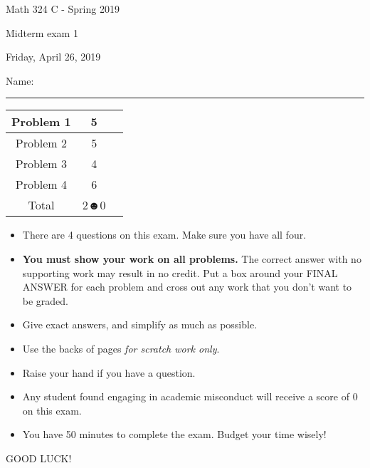 \documentclass[12 pt]{report}
\begin{document}
\noindent \vfill \noindent \large

\centerline{Math 324 C - Spring 2019}

\centerline{Midterm exam 1}

\centerline{Friday, April 26, 2019}

\normalsize

\vfill
\medskip
Name: \rule{10cm}{1pt}

\bigskip

\vfill
\begin{center}
{\large
\begin{tabular}{||c|c|r||}
\hline Problem 1 & 5 & \hspace{10mm} \hfill \\
\hline Problem 2 & 5  & \hspace{10mm} \hfill \\
\hline Problem 3 & 4 & \hspace{10mm} \hfill \\
\hline Problem 4 & 6  & \hspace{10mm} \hfill \\
\hline Total & 2☻0 & \hspace{10mm} \hfill \\
\hline
\end{tabular}
}
\end{center}
\vfill
\begin{itemize}
\item There are 4 questions on this exam. Make sure you have all four.
\item \textbf{You must show your work on all problems.}  The correct answer
with no supporting work may result in no credit. Put a box
around your FINAL ANSWER for each problem and cross out any work
that you don't want to be graded.
\item Give exact answers, and simplify as much as possible. 
\item Use the backs of pages \textit{for scratch work only}.
\item Raise your hand if you have a question.
\item Any student found engaging in academic misconduct will receive
a score of 0 on this exam.
\item You have 50 minutes to complete the exam.  Budget your time wisely! \\
\end{itemize}
\vfill
\begin{center}GOOD LUCK!\end{center}
\end{document}
